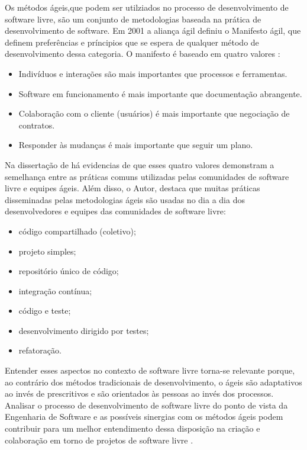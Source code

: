 Os métodos ágeis,que podem ser utilziados no processo de desenvolvimento de software livre, são um conjunto de metodologias baseada na prática de desenvolvimento de software. Em 2001 a aliança ágil definiu o Manifesto ágil, que definem preferências e príncipios que se espera de qualquer método de desenvolvimento dessa categoria. O manifesto é baseado em quatro valores \cite{beck2001agile}:
\begin{itemize}
\item Indivíduos e interações são mais importantes que processos e ferramentas.
\item Software em funcionamento é mais importante que documentação abrangente.
\item Colaboração com o cliente (usuários) é mais importante que negociação de contratos.
\item Responder às mudanças é mais importante que seguir um plano.
\end{itemize}

Na dissertação de  há evidencias de que esses quatro valores demonstram a semelhança entre as práticas comuns utilizadas pelas comunidades de software livre e equipes ágeis. Além disso, o Autor, destaca que muitas práticas disseminadas pelas metodologias ágeis são usadas no dia a dia dos desenvolvedores e equipes das comunidades de software livre:
\begin{itemize}
\item código compartilhado (coletivo);
\item projeto simples;
\item repositório único de código;
\item integração contínua;
\item código e teste;
\item desenvolvimento dirigido por testes;
\item refatoração.
\end{itemize}

Entender esses aspectos no contexto de software livre torna-se relevante porque, ao contrário dos métodos tradicionais de desenvolvimento, o ágeis são adaptativos ao invés de prescritivos e são orientados às pessoas ao invés dos processos. Analisar o processo de desenvolvimento de software livre do ponto de vista da Engenharia de Software e as possíveis sinergias com os métodos ágeis podem contribuir para um melhor entendimento dessa disposição na criação e colaboração em torno de projetos de software livre \cite{meirelles2013}.

